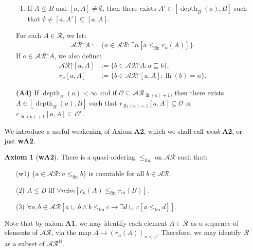 \documentclass[11pt,reqno]{amsart}
\theoremstyle{plain}
\numberwithin{equation}{section}
\theoremstyle{definition}
\newtheorem*{axiom}{Axiom}
\newcommand{\func}{\operatorname}
\newcommand{\N}{\mathbb{N}}
\newcommand{\cal}{\mathcal}
\newcommand{\restrictedto}{\mathord{\upharpoonright}}
\newcommand{\lh}{\func{lh}}
\renewcommand{\O}{\cal{O}}
\newcommand{\depth}{\func{depth}}
\newcommand{\fin}{\mathrm{fin}}
\begin{document}
\begin{enumerate}
\begin{enumerate}[label=(\arabic*)]
        \item If $A \leq B$ and $[a,A] \neq \emptyset$, then there exists $A' \in [\depth_B(a),B]$ such that $\emptyset \neq [a,A'] \subseteq [a,A]$.
    \end{enumerate}
    For each $A \in \cal{R}$, we let:
    \begin{align*}
        \cal{AR}\restrictedto A := \{a \in \cal{AR} : \exists n[a \leq_\fin r_n(A)]\}.
    \end{align*}
    If $a \in \cal{AR}\restrictedto A$, we also define:
    \begin{align*}
        \cal{AR}\restrictedto[a,A] &:= \{b \in \cal{AR}\restrictedto A : a \sqsubseteq b\}, \\
        r_n[a,A] &:= \{b \in \cal{AR}\restrictedto[a,A] : \lh(b) = n\}.
    \end{align*}

    \item[\textbf{(A4)}] If $\depth_B(a) < \infty$ and if $\O \subseteq \cal{AR}_{\lh(a)+1}$, then there exists $A \in [\depth_B(a),B]$ such that $r_{\lh(a)+1}[a,A] \subseteq \O$ or $r_{\lh(a)+1}[a,A] \subseteq \O^c$.
\end{enumerate}

We introduce a useful weakening of Axiom \textbf{A2}, which we shall call \emph{weak} \textbf{A2}, or just \textbf{wA2}.

\begin{axiom}[\textbf{wA2}]
    There is a quasi-ordering $\leq_\fin$ on $\cal{AR}$ such that:
    \begin{enumerate}
        \item[(w1)] $\{a \in \cal{AR} : a \leq_\fin b\}$ is countable for all $b \in \cal{AR}$.
    
        \item[(2)] $A \leq B$ iff $\forall n \exists m [r_n(A) \leq_\fin r_m(B)]$.
    
        \item[(3)] $\forall a,b \in \cal{AR}[a \sqsubseteq b \wedge b \leq_\fin c \to \exists d \sqsubseteq c[a \leq_\fin d]]$.
    \end{enumerate}
\end{axiom}

Note that by axiom \textbf{A1}, we may identify each element $A \in \cal{R}$ as a sequence of elements of $\cal{AR}$, via the map $A \mapsto (r_n(A))_{n<\omega}$. Therefore, we may identify $\cal{R}$ as a subset of $\cal{AR}^\N$.
\end{document}
